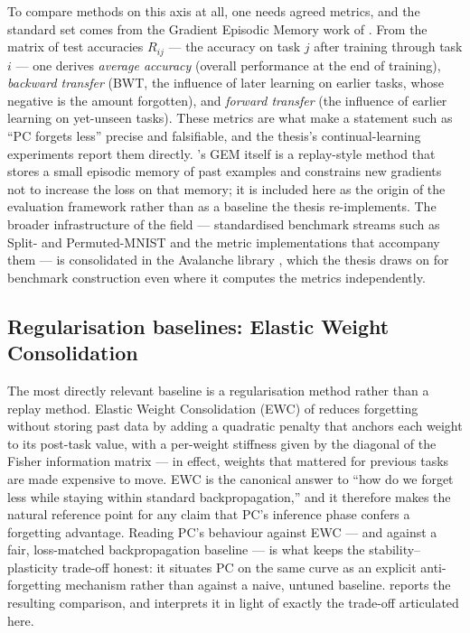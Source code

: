To compare methods on this axis at all, one needs agreed metrics, and the standard set comes
from the Gradient Episodic Memory work of \citet{lopezpaz2017gem}. From the matrix of
test accuracies $R_{ij}$ --- the accuracy on task $j$ after training through task $i$ --- one
derives \emph{average accuracy} (overall performance at the end of training),
\emph{backward transfer} (BWT, the influence of later learning on earlier tasks, whose
negative is the amount forgotten), and \emph{forward transfer} (the influence of earlier
learning on yet-unseen tasks). These metrics are what make a statement such as ``PC forgets
less'' precise and falsifiable, and the thesis's continual-learning experiments report them
directly. \citet{lopezpaz2017gem}'s GEM itself is a replay-style method that stores a small
episodic memory of past examples and constrains new gradients not to increase the loss on
that memory; it is included here as the origin of the evaluation framework rather than as a
baseline the thesis re-implements. The broader infrastructure of the field --- standardised
benchmark streams such as Split- and Permuted-MNIST and the metric implementations that
accompany them --- is consolidated in the Avalanche library \citep{lomonaco2021avalanche},
which the thesis draws on for benchmark construction even where it computes the metrics
independently.

\subsection{Regularisation baselines: Elastic Weight Consolidation}

The most directly relevant baseline is a regularisation method rather than a replay method.
Elastic Weight Consolidation (EWC) of \citet{kirkpatrick2017ewc} reduces forgetting without
storing past data by adding a quadratic penalty that anchors each weight to its
post-task value, with a per-weight stiffness given by the diagonal of the Fisher information
matrix --- in effect, weights that mattered for previous tasks are made expensive to move.
EWC is the canonical answer to ``how do we forget less while staying within standard
backpropagation,'' and it therefore makes the natural reference point for any claim that
PC's inference phase confers a forgetting advantage. Reading PC's behaviour against EWC ---
and against a fair, loss-matched backpropagation baseline --- is what keeps the
stability--plasticity trade-off honest: it situates PC on the same curve as an explicit
anti-forgetting mechanism rather than against a naive, untuned baseline. 
reports the resulting comparison, and  interprets it in light of exactly
the trade-off articulated here.

